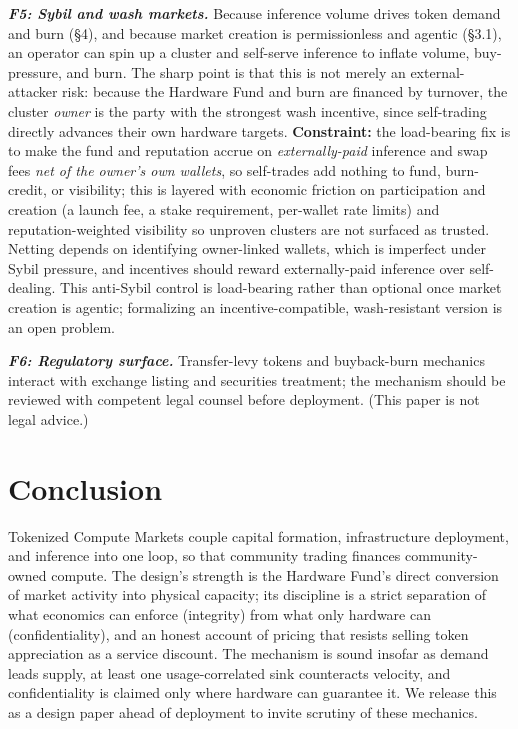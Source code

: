 \documentclass[11pt]{article}
\newcommand{\ph}[1]{\textbf{\textit{#1}}}
\begin{document}
\ph{F5: Sybil and wash markets.} Because inference volume drives token demand and burn (\S4), and because market creation is permissionless and agentic (\S3.1), an operator can spin up a cluster and self-serve inference to inflate volume, buy-pressure, and burn. The sharp point is that this is not merely an external-attacker risk: because the Hardware Fund and burn are financed by turnover, the cluster \textit{owner} is the party with the strongest wash incentive, since self-trading directly advances their own hardware targets. \textbf{Constraint:} the load-bearing fix is to make the fund and reputation accrue on \textit{externally-paid} inference and swap fees \textit{net of the owner's own wallets}, so self-trades add nothing to fund, burn-credit, or visibility; this is layered with economic friction on participation and creation (a launch fee, a stake requirement, per-wallet rate limits) and reputation-weighted visibility so unproven clusters are not surfaced as trusted. Netting depends on identifying owner-linked wallets, which is imperfect under Sybil pressure, and incentives should reward externally-paid inference over self-dealing. This anti-Sybil control is load-bearing rather than optional once market creation is agentic; formalizing an incentive-compatible, wash-resistant version is an open problem.

\ph{F6: Regulatory surface.} Transfer-levy tokens and buyback-burn mechanics interact with exchange listing and securities treatment; the mechanism should be reviewed with competent legal counsel before deployment. (This paper is not legal advice.)

\section{Conclusion}
Tokenized Compute Markets couple capital formation, infrastructure deployment, and inference into one loop, so that community trading finances community-owned compute. The design's strength is the Hardware Fund's direct conversion of market activity into physical capacity; its discipline is a strict separation of what economics can enforce (integrity) from what only hardware can (confidentiality), and an honest account of pricing that resists selling token appreciation as a service discount. The mechanism is sound insofar as demand leads supply, at least one usage-correlated sink counteracts velocity, and confidentiality is claimed only where hardware can guarantee it. We release this as a design paper ahead of deployment to invite scrutiny of these mechanics.
\end{document}
